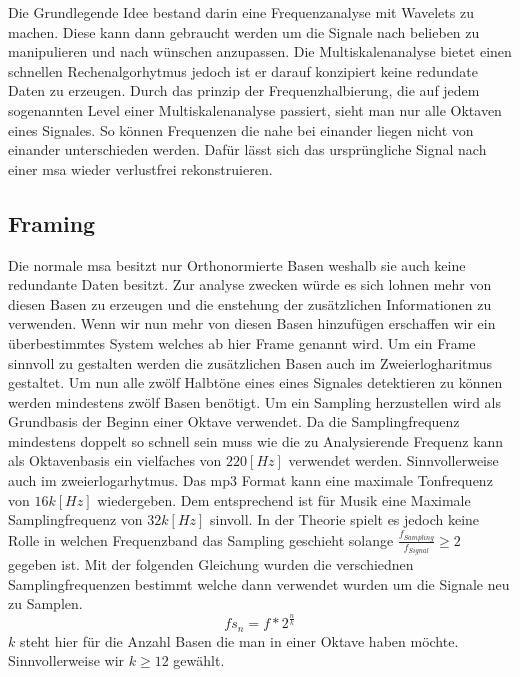 



Die Grundlegende Idee bestand darin eine Frequenzanalyse mit Wavelets zu machen. Diese kann dann gebraucht werden um die Signale nach belieben zu manipulieren und nach wünschen anzupassen. Die Multiskalenanalyse bietet einen schnellen Rechenalgorhytmus jedoch ist er darauf konzipiert keine redundate Daten zu erzeugen. Durch das prinzip der Frequenzhalbierung, die auf jedem sogenannten Level einer Multiskalenanalyse passiert, sieht man nur alle Oktaven eines Signales. So können Frequenzen die nahe bei einander liegen nicht von einander unterschieden werden. Dafür lässt sich das ursprüngliche Signal nach einer msa wieder verlustfrei rekonstruieren.

\subsection{Framing}
Die normale msa besitzt nur Orthonormierte Basen weshalb sie auch keine redundante Daten besitzt. Zur analyse zwecken würde es sich lohnen mehr von diesen Basen zu erzeugen und die enstehung der zusätzlichen Informationen zu verwenden. Wenn wir nun mehr von diesen Basen hinzufügen erschaffen wir ein überbestimmtes System welches ab hier Frame genannt wird. Um ein Frame sinnvoll zu gestalten werden die zusätzlichen Basen auch im Zweierlogharitmus gestaltet. Um nun alle zwölf Halbtöne eines eines Signales detektieren zu können werden mindestens zwölf Basen benötigt. Um ein Sampling herzustellen wird als Grundbasis der Beginn einer Oktave verwendet. Da die Samplingfrequenz mindestens doppelt so schnell sein muss wie die zu Analysierende Frequenz kann als Oktavenbasis ein vielfaches von $220[Hz]$ verwendet werden. Sinnvollerweise auch im zweierlogarhytmus. Das mp3 Format kann eine maximale Tonfrequenz von $16k[Hz]$ wiedergeben. Dem entsprechend ist für Musik eine Maximale Samplingfrequenz von $32k[Hz]$ sinvoll. In der Theorie spielt es jedoch keine Rolle in welchen Frequenzband das Sampling geschieht solange $\frac{f_{Sampling}}{f_{Signal}}\geq2$ gegeben ist. Mit der folgenden Gleichung wurden die verschiednen Samplingfrequenzen bestimmt welche dann verwendet wurden um die Signale neu zu Samplen. 
\begin{equation}
fs_{n}=f*2^{\frac{n}{k}}
\end{equation}
$k$ steht hier für die Anzahl Basen die man in einer Oktave haben möchte. Sinnvollerweise wir $k \geq 12$ gewählt.\\

